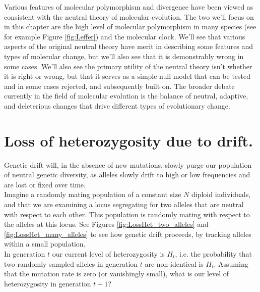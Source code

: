 Various features of molecular polymorphism and divergence have been viewed as consistent with the neutral theory of molecular evolution. The two we'll focus on in this chapter are the high level of molecular polymorphism in many species (see for example Figure \ref{fig:Leffer}) and the molecular clock. We'll see that various aspects of the original neutral theory have merit in describing some features and types of molecular change, but we'll also see that it is demonstrably wrong in some cases. We'll also see the primary utility of the neutral theory isn't whether it is right or wrong, but that it serves as a simple null model that can be tested and in some cases rejected, and subsequently built on. The broader debate currently in the field of molecular evolution is the balance of neutral, adaptive, and deleterious changes that drive different types of evolutionary change.

\section{Loss of heterozygosity due to drift.} \label{LossofHet}

Genetic drift will, in the absence of new mutations, slowly purge our population of neutral genetic diversity, as alleles slowly drift to high or low
frequencies and are lost or fixed over time. \\

Imagine a randomly mating population of a constant size $N$ diploid individuals, and that we
are examining a locus segregating for two alleles that are neutral with respect
to each other.  This population is randomly mating with respect to the alleles
at this locus. See Figures \ref{fig:LossHet_two_alleles} and
\ref{fig:LossHet_many_alleles} to see how genetic drift proceeds, by tracking
alleles within a small population. \\


In generation $t$ our current level of heterozygosity is $H_t$,
i.e. the probability that two randomly sampled alleles in generation
$t$ are non-identical is $H_t$. Assuming that the mutation rate is
zero (or vanishingly small), what is our level of heterozygosity in
generation $t+1$?\\

